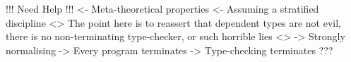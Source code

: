



%
%
%



\begin{wstructure}
!!! Need Help !!!
<- Meta-theoretical properties
    <- Assuming a stratified discipline
    <> The point here is to reassert that dependent types are not evil, 
       there is no non-terminating type-checker, or such horrible lies <>
    -> Strongly normalising
        -> Every program terminates
    -> Type-checking terminates
    ???
\end{wstructure}



